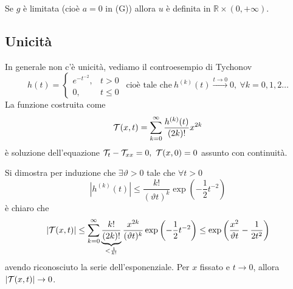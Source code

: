 \documentclass[10pt,a4paper,twoside,openright]{book}
\begin{document}

\begin{oss}
Se $g$ è limitata (cioè $a=0$ in (G)) allora $u$ è definita in $\mathbb{R} \times (0,+\infty)$.
\end{oss}
\subsection{Unicità}

In generale non c'è unicità, vediamo il controesempio di Tychonov
\begin{equation*}
h(t) =\begin{cases}
e^{-t^{-2}}, & t >0\\
0, & t\leqslant 0
\end{cases} \ \ \text{cioè tale che} \ h^{(k)}(t)\xrightarrow{t\rightarrow 0} 0,\ \forall k=0,1,2\dotsc 
\end{equation*}
La funzione costruita come
\begin{equation*}
\mathcal{T} (x,t) =\sum\limits ^{\infty }_{k=0}\frac{h^{(k)}(t)}{(2k) !} x^{2k}
\end{equation*}
è soluzione dell'equazione $\mathcal{T} _{t} -\mathcal{T} _{xx} =0,\ \mathcal{T} (x,0) =0$ assunto con continuità.

Si dimostra per induzione che $\exists \vartheta  >0$ tale che $\forall t >0$
\begin{equation*}
\left| h^{(k)}(t)\right| \leqslant \frac{k!}{(\vartheta t)^{k}}\exp\left( -\frac{1}{2} t^{-2}\right)
\end{equation*}
è chiaro che
\begin{equation*}
| \mathcal{T} (x,t)| \leq \sum\limits ^{\infty }_{k=0}\underbrace{\frac{k!}{(2k) !}}_{< \frac{1}{k!}}\frac{x^{2k}}{(\vartheta t)^{k}}\exp\left( -\frac{1}{2} t^{-2}\right) \leq \exp\left(\frac{x^{2}}{\vartheta t} -\frac{1}{2t^{2}}\right)
\end{equation*}
avendo riconosciuto la serie dell'esponenziale. Per $x$ fissato e $t\rightarrow 0$, allora $| \mathcal{T} (x,t)| \rightarrow 0$.
\end{document}
